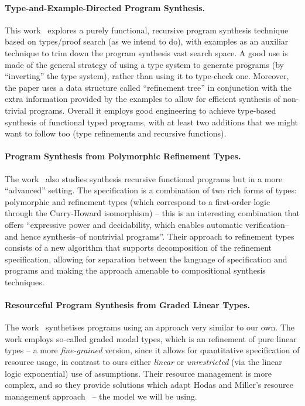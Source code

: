 \documentclass{llncs}
\newcommand{\mypara}[1]{\paragraph{\textbf{#1}.}}
\begin{document}
\mypara{Type-and-Example-Directed Program Synthesis} This
work~\cite{DBLP:conf/pldi/OseraZ15,DBLP:conf/popl/FrankleOWZ16}
explores a purely functional, recursive program synthesis technique
based on types/proof search (as we intend to do), with examples as an
auxiliar technique to trim down the program synthesis vast search
space. A good use is
made of the general strategy of using a type system to generate
programs (by ``inverting'' the type system), rather than using it to
type-check one.  Moreover, the paper uses a data structure called
``refinement tree'' in conjunction with the extra information provided
by the examples to allow for efficient synthesis of non-trivial
programs. Overall it employs good engineering to achieve type-based
synthesis of functional typed programs, with at least two additions
that we might want to follow too (type refinements and recursive
functions).

  
\mypara{Program Synthesis from Polymorphic Refinement Types} The
work~\cite{DBLP:conf/pldi/PolikarpovaKS16} also studies synthesis
recursive functional programs but in a more ``advanced'' setting. The
specification is a combination of two rich forms of types: polymorphic and
refinement types (which correspond to a first-order logic through the
Curry-Howard isomorphism) -- this is an interesting combination that offers
``expressive power and decidability, which enables automatic
verification--and hence synthesis--of nontrivial programs''.  Their
approach to refinement types consists of a new algorithm that supports
decomposition of the refinement specification, allowing for separation
between the language of specification and programs and making the
approach amenable to compositional synthesis techniques.

\mypara{Resourceful Program Synthesis from Graded Linear Types} The
work~\cite{DBLP:conf/lopstr/HughesO20} synthetises programs using an
approach very similar to our own.  The work employs so-called graded
modal types, which is an refinement of pure linear types -- a more
\emph{fine-grained} version, since it allows for quantitative
specification of resource usage, in contrast to ours either
\emph{linear} or \emph{unrestricted} (via the linear logic
exponential) use of assumptions.  Their resource management is more
complex, and so they provide solutions which adapt Hodas and Miller's
resource management
approach~\cite{DBLP:journals/tcs/CervesatoHP00,DBLP:journals/tcs/LiangM09}
-- the model we will be using.
\end{document}
